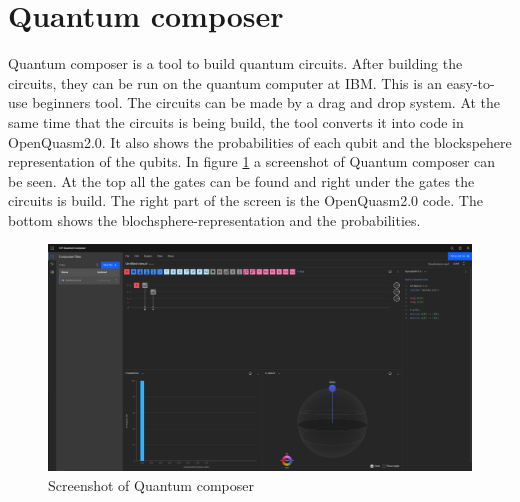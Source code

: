 \section{Quantum composer}
\label{sec:Composer}
Quantum composer is a tool to build quantum circuits. After building the circuits, they can be run on the quantum computer at IBM. This is an easy-to-use beginners tool. The circuits can be made by a drag and drop system.
At the same time that the circuits is being build, the tool converts it into code in OpenQuasm2.0. It also shows the probabilities of each qubit and the blockspehere representation of the qubits.
In figure \ref{fig:Quantum composer} a screenshot of Quantum composer can be seen. At the top all the gates can be found and right under the gates the circuits is build. The right part of the screen is the OpenQuasm2.0 code.
The bottom shows the blochsphere-representation and the probabilities.

\begin{figure} [h]
    \centering
    \includegraphics[width=\textwidth]{img/composer.PNG}
        \caption{Screenshot of Quantum composer}
        \label{fig:Quantum composer}
\end{figure}